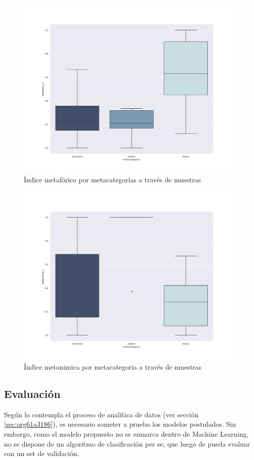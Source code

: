 \documentclass[12pt,letterpaper,twoside]{article}
\begin{document}
\begin{figure}[H]
\centering
\includegraphics[width=0.9\linewidth]{./resultados/graphs/total/metafora_total.png}
\caption{\label{fig:metafora_total} Índice metafórico por metacategorías a través de muestras }
\end{figure}

\begin{figure}[H]
\centering
\includegraphics[width=0.9\linewidth]{./resultados/graphs/total/metonimia_total.png}
\caption{\label{fig:metonimia_total} Índice metonimica por metacategoria a través de muestras }
\end{figure}

\subsection{Evaluación}
\label{sec:orgc5e083b}
Según lo contempla el proceso de analítica de datos (ver sección \ref{sec:org61a3186}),
es necesario someter a prueba los modelos postulados. Sin embargo, como el modelo propuesto
no se enmarca dentro de Machine Learning, no se dispone de un algoritmo de clasificación
per se, que luego de pueda evaluar con un set de validación.
\end{document}
